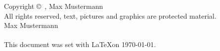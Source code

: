 \restoregeometry

\newpage
\thispagestyle{empty} \enlargethispage{20mm} \vspace*{25mm}%
\normalsize
\phantom{x}
\vfill
\noindent Copyright \copyright\ \the\year, Max Mustermann\\
All rights reserved, text, pictures and graphics are protected
material.
\\[10mm]
Max Mustermann\\
\makeatother \\[5mm]
\vspace{10mm} \noindent \scriptsize This document was set with \LaTeX on \today.
\clearpage